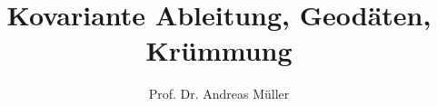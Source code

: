 %
%
%


\beamertemplatenavigationsymbolsempty
\title[KGK]{Kovariante Ableitung, Geodäten, Krümmung}
\author[A.~Müller]{Prof. Dr. Andreas Müller}
\date[]{}


